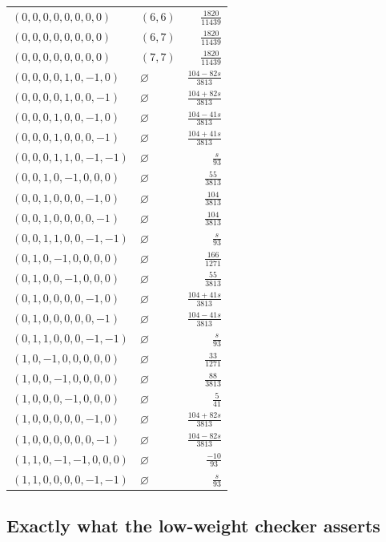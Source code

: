 \begin{longtable}{@{}llr@{}}
$(0,0,0,0,0,0,0,0)$ & $(6,6)$ & $\frac{1820}{11439}$\\
$(0,0,0,0,0,0,0,0)$ & $(6,7)$ & $\frac{1820}{11439}$\\
$(0,0,0,0,0,0,0,0)$ & $(7,7)$ & $\frac{1820}{11439}$\\
$(0,0,0,0,1,0,-1,0)$ & $\varnothing$ & $\frac{104-82s}{3813}$\\
$(0,0,0,0,1,0,0,-1)$ & $\varnothing$ & $\frac{104+82s}{3813}$\\
$(0,0,0,1,0,0,-1,0)$ & $\varnothing$ & $\frac{104-41s}{3813}$\\
$(0,0,0,1,0,0,0,-1)$ & $\varnothing$ & $\frac{104+41s}{3813}$\\
$(0,0,0,1,1,0,-1,-1)$ & $\varnothing$ & $\frac{s}{93}$\\
$(0,0,1,0,-1,0,0,0)$ & $\varnothing$ & $\frac{55}{3813}$\\
$(0,0,1,0,0,0,-1,0)$ & $\varnothing$ & $\frac{104}{3813}$\\
$(0,0,1,0,0,0,0,-1)$ & $\varnothing$ & $\frac{104}{3813}$\\
$(0,0,1,1,0,0,-1,-1)$ & $\varnothing$ & $\frac{s}{93}$\\
$(0,1,0,-1,0,0,0,0)$ & $\varnothing$ & $\frac{166}{1271}$\\
$(0,1,0,0,-1,0,0,0)$ & $\varnothing$ & $\frac{55}{3813}$\\
$(0,1,0,0,0,0,-1,0)$ & $\varnothing$ & $\frac{104+41s}{3813}$\\
$(0,1,0,0,0,0,0,-1)$ & $\varnothing$ & $\frac{104-41s}{3813}$\\
$(0,1,1,0,0,0,-1,-1)$ & $\varnothing$ & $\frac{s}{93}$\\
$(1,0,-1,0,0,0,0,0)$ & $\varnothing$ & $\frac{33}{1271}$\\
$(1,0,0,-1,0,0,0,0)$ & $\varnothing$ & $\frac{88}{3813}$\\
$(1,0,0,0,-1,0,0,0)$ & $\varnothing$ & $\frac{5}{41}$\\
$(1,0,0,0,0,0,-1,0)$ & $\varnothing$ & $\frac{104+82s}{3813}$\\
$(1,0,0,0,0,0,0,-1)$ & $\varnothing$ & $\frac{104-82s}{3813}$\\
$(1,1,0,-1,-1,0,0,0)$ & $\varnothing$ & $\frac{-10}{93}$\\
$(1,1,0,0,0,0,-1,-1)$ & $\varnothing$ & $\frac{s}{93}$\\
\end{longtable}
\endgroup

\subsection{Exactly what the low-weight checker asserts}
\label{expfinite:low-checker}

